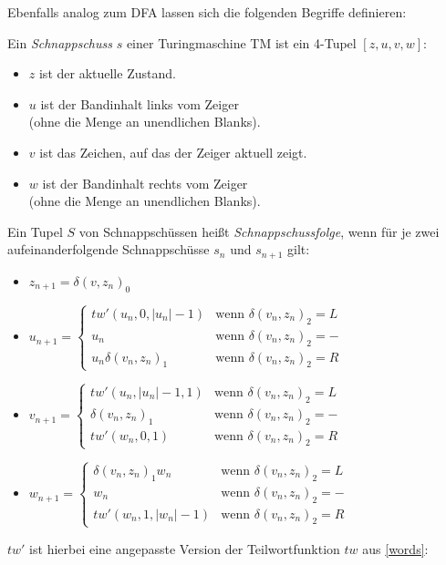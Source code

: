 Ebenfalls analog zum DFA lassen sich die folgenden Begriffe definieren:

Ein \emph{Schnappschuss} $s$ einer Turingmaschine TM ist ein 4-Tupel $[z,u,v,w]$:
\begin{itemize}
    \item $z$ ist der aktuelle Zustand.
    \item $u$ ist der Bandinhalt links vom Zeiger\\(ohne die Menge an unendlichen Blanks).
    \item $v$ ist das Zeichen, auf das der Zeiger aktuell zeigt.
    \item $w$ ist der Bandinhalt rechts vom Zeiger\\(ohne die Menge an unendlichen Blanks).
\end{itemize}
Ein Tupel $S$ von Schnappschüssen heißt \emph{Schnappschussfolge},
wenn für je zwei aufeinanderfolgende Schnappschüsse $s_n$ und $s_{n+1}$ gilt:
\begin{itemize}
    \item $z_{n+1} = \delta(v, z_n)_0$
    \item $u_{n+1} = \begin{cases}
            tw'(u_n, 0, |u_n|-1) & \text{wenn } \delta(v_n, z_n)_2 = L\\
            u_n                  & \text{wenn } \delta(v_n, z_n)_2 = -\\
            u_n\delta(v_n,z_n)_1 & \text{wenn } \delta(v_n, z_n)_2 = R
        \end{cases}$
    \item $v_{n+1} = \begin{cases}
            tw'(u_n, |u_n|-1, 1) & \text{wenn } \delta(v_n, z_n)_2 = L\\
            \delta(v_n, z_n)_1   & \text{wenn } \delta(v_n, z_n)_2 = -\\
            tw'(w_n, 0, 1)       & \text{wenn } \delta(v_n, z_n)_2 = R
        \end{cases}$
    \item $w_{n+1} = \begin{cases}
            \delta(v_n,z_n)_1w_n & \text{wenn } \delta(v_n, z_n)_2 = L\\
            w_n                  & \text{wenn } \delta(v_n, z_n)_2 = -\\
            tw'(w_n, 1, |w_n|-1) & \text{wenn } \delta(v_n, z_n)_2 = R
        \end{cases}$
\end{itemize}
\noindent
$tw'$ ist hierbei eine angepasste Version der Teilwortfunktion $tw$ aus \autoref{words}:
